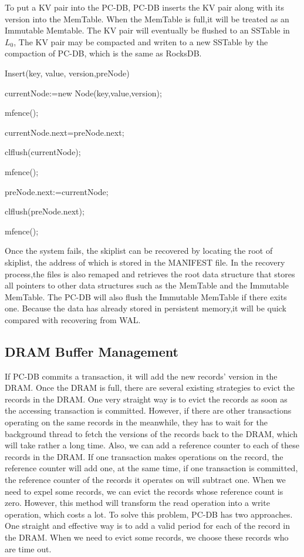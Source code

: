 To put a KV pair into the PC-DB, PC-DB inserts the KV pair along with its version into the MemTable. When the MemTable is full,it will be treated as an Immutable Memtable. The KV pair will eventually be flushed to an SSTable in $L_0$, 
The KV pair may be compacted and writen to a new SSTable by the compaction of PC-DB, which is the same as RocksDB.


\begin{algorithm}[t]
\caption{Insert(key, value, version,preNode)} %


currentNode:=new Node(key,value,version);

mfence();

currentNode.next=preNode.next;

clflush(currentNode);

mfence();

preNode.next:=currentNode;

clflush(preNode.next);

mfence();

\end{algorithm}

Once the system fails, 
the skiplist can be recovered  by locating the root of skiplist, 
the address of which is stored in the MANIFEST file. In the recovery process,the files is also remaped and retrieves the root data structure that stores all pointers to other data structures such as the MemTable and the Immutable MemTable. The PC-DB will also flush the Immutable MemTable if there exits one.
Because the data has already stored in persistent memory,it will be quick compared with recovering from WAL.



    
\subsection{DRAM Buffer Management}
If PC-DB commits a transaction, it will add the new records' version in the DRAM. Once the DRAM is full, there are several existing strategies to evict the records in the DRAM. One very straight way is to evict the records as soon as the accessing transaction is committed. 
However, if there are other transactions operating on the same records in the meanwhile, they has to wait for the background thread to fetch the versions of the records back to the DRAM, which will take rather a long time. Also, we can  add a reference counter to each of these records in the DRAM. If one transaction makes operations on the record, the reference counter will add one, at the same time, if one transaction is committed, the reference counter of the records it operates on will subtract one. When we need to expel some records, we can evict the records whose reference count is zero. However, this method will transform the read operation into a write operation, which costs a lot. To solve this problem, PC-DB has two approaches. One straight and effective way is to add a valid period for each of the record in the DRAM. When we need to evict some records, we choose these records who are time out. 

